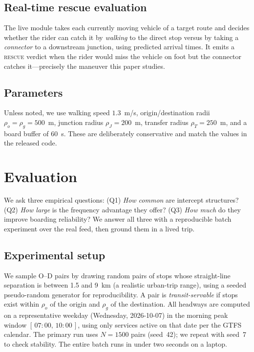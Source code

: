 \documentclass[conference]{IEEEtran}
\begin{document}
\subsection{Real-time rescue evaluation}
The live module takes each currently moving vehicle of a target route and decides
whether the rider can catch it by \emph{walking} to the direct stop versus by
taking a \emph{connector} to a downstream junction, using predicted arrival
times. It emits a \textsc{rescue} verdict when the rider would miss the vehicle on
foot but the connector catches it---precisely the maneuver this paper studies.

\subsection{Parameters}
Unless noted, we use walking speed $1.3$~m/s, origin/destination radii
$\rho_o=\rho_g=500$~m, junction radius $\rho_J=200$~m, transfer radius
$\rho_T=250$~m, and a board buffer of 60~s. These are deliberately conservative
and match the values in the released code.

\section{Evaluation}
\label{sec:eval}
We ask three empirical questions: (Q1) \emph{How common} are intercept
structures? (Q2) \emph{How large} is the frequency advantage they offer? (Q3)
\emph{How much} do they improve boarding reliability? We answer all three with a
reproducible batch experiment over the real feed, then ground them in a lived
trip.

\subsection{Experimental setup}
We sample O--D pairs by drawing random pairs of stops whose straight-line
separation is between 1.5 and 9~km (a realistic urban-trip range), using a seeded
pseudo-random generator for reproducibility. A pair is \emph{transit-servable} if
stops exist within $\rho_o$ of the origin and $\rho_g$ of the destination. All
headways are computed on a representative weekday (Wednesday, 2026-10-07) in the
morning peak window $[\,07\!:\!00,\,10\!:\!00\,]$, using only services active on
that date per the GTFS calendar. The primary run uses $N=1500$ pairs (seed~42);
we repeat with seed~7 to check stability. The entire batch runs in under two
seconds on a laptop.
\end{document}
